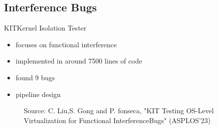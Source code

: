 \subsection{Interference Bugs}
\begin{frame}{KIT}{Kernel Isolation Tester}
\begin{itemize}
    \setlength\itemsep{1em}
    \item focuses on functional interference
    \item implemented in around 7500 lines of code 
    \item found 9 bugs
    \item pipeline design
\end{itemize}
\begin{figure}[hb]
    \centering
\def\stackalignment{l}
           {\scriptsize
            Source: C. Liu,S. Gong and P. fonseca, "KIT  Testing OS-Level Virtualization for Functional InterferenceBugs" (ASPLOS'23)}
    \end{figure}
\end{frame}